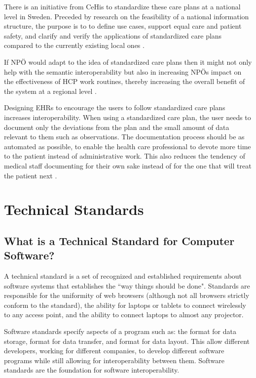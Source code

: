 \documentclass[14pt]{article}
\begin{document}
There is an initiative from \gls{CeHis} to standardize these care plans at a national level in Sweden. Preceded by research on the feasibility of a national information structure, the purpose is to to define use cases, support equal care and patient safety, and clarify and verify the applications of standardized care plans compared to the currently existing local ones \cite{CeHis}.

If NPÖ would adapt to the idea of standardized care plans then it might not only help with the semantic interoperability but also in increasing NPÖs impact on the effectiveness of HCP work routines, thereby increasing the overall benefit of the system at a regional level \cite{Cambio}.

Designing \glspl{EHR} to encourage the users to follow standardized care plans increases interoperability. When using a standardized care plan, the user needs to document only the deviations from the plan and the small amount of data relevant to them such as observations. The documentation process should be as automated as possible, to enable the health care professional to devote more time to the patient instead of administrative work. This also reduces the tendency of medical staff documenting for their own sake instead of for the one that will treat the patient next \cite{Cambio}.

\newpage

\section{Technical Standards}
\label{sec:TechnicalStandards}

\subsection{What is a Technical Standard for Computer Software?}
\label{sec:technicalStandardsWhatIs}
A technical standard is a set of recognized and established requirements about software systems that establishes the ``way things should be done". Standards are responsible for the uniformity of web browsers (although not all browsers strictly conform to the standard), the ability for laptops or tablets to connect wirelessly to any access point, and the ability to connect laptops to almost any projector.

Software standards specify aspects of a program such as: the format for data storage, format for data transfer, and format for data layout. This allow different developers, working for different companies, to develop different software programs while still allowing for \gls{interoperability} between them. Software standards are the foundation for software \gls{interoperability}.
\end{document}
